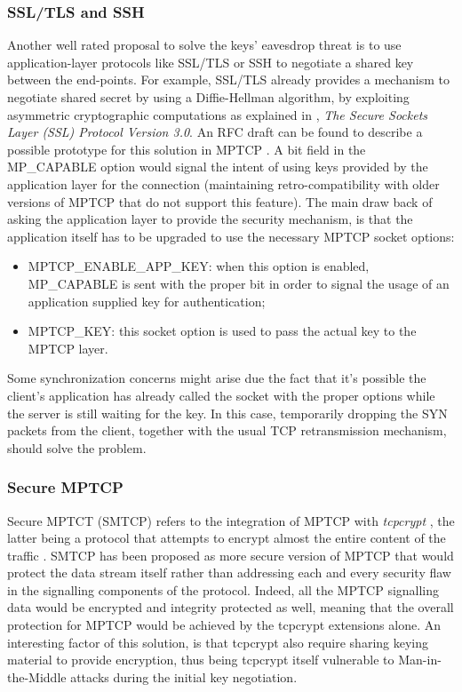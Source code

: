 \subsubsection{SSL/TLS and SSH}
Another well rated proposal to solve the keys' eavesdrop threat is to use application-layer protocols like SSL/TLS or SSH to negotiate a shared key between the end-points. For example, SSL/TLS already provides a mechanism to negotiate shared secret by using a Diffie-Hellman algorithm, by exploiting asymmetric cryptographic computations as explained in , \textit{The Secure Sockets Layer (SSL) Protocol Version 3.0}. An RFC draft can be found to describe a possible prototype for this solution in MPTCP \cite{paasch-mptcp-ssl-00}. A bit field in the MP\_CAPABLE option would signal the intent of using keys provided by the application layer for the connection (maintaining retro-compatibility with older versions of MPTCP that do not support this feature).
The main draw back of asking the application layer to provide the security mechanism, is that the application itself has to be upgraded to use the necessary MPTCP socket options:

\begin{itemize}
  \item MPTCP\_ENABLE\_APP\_KEY: when this option is enabled, MP\_CAPABLE is sent with the proper bit in order to signal the usage of an application supplied key for authentication;
  \item MPTCP\_KEY: this socket option is used to pass the actual key to the MPTCP layer.
\end{itemize}

Some synchronization concerns might arise due the fact that it's possible the client's application has already called the socket with the proper options while the server is still waiting for the key. In this case, temporarily dropping the SYN packets from the client, together with the usual TCP retransmission mechanism, should solve the problem.

\subsubsection{Secure MPTCP}
Secure MPTCT (SMTCP) refers to the integration of MPTCP with \textit{tcpcrypt} \cite{draft-bagnulo-mptcp-secure}, the latter being a protocol that attempts to encrypt almost the entire content of the traffic \cite{ietf-tcpinc-tcpcrypt-00}. SMTCP has been proposed as more secure version of MPTCP that would protect the data stream itself rather than addressing each and every security flaw in the signalling components of the protocol. Indeed, all the MPTCP signalling data would be encrypted and integrity protected as well, meaning that the overall protection for MPTCP would be achieved by the {tcpcrypt} extensions alone. An interesting factor of this solution, is that tcpcrypt also require sharing keying material to provide encryption, thus being tcpcrypt itself vulnerable to Man-in-the-Middle attacks during the initial key negotiation.

